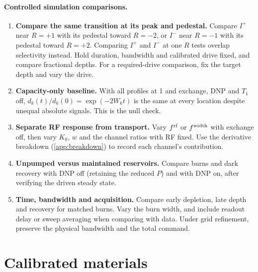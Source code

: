 \documentclass[11pt]{article}
\newcommand{\Iplus}{I^{+}}
\newcommand{\Iminus}{I^{-}}
\begin{document}
\paragraph{Controlled simulation comparisons.}
\begin{enumerate}
  \item \textbf{Compare the same transition at its peak and pedestal.} Compare \(\Iplus\) near
  \(R=+1\) with its pedestal toward \(R=-2\), or \(\Iminus\) near \(R=-1\) with its pedestal toward
  \(R=+2\). Comparing \(\Iplus\) and \(\Iminus\) at one \(R\) tests overlap selectivity instead.
  Hold duration, bandwidth and calibrated drive fixed, and compare fractional depths. For a
  required-drive comparison, fix the target depth and vary the drive.
  \item \textbf{Capacity-only baseline.} With all profiles at 1 and exchange, DNP and \(T_1\) off,
  \(d_k(t)/d_k(0)=\exp(-2W_kt)\) is the same at every location despite unequal absolute signals.
  This is the null check.
  \item \textbf{Separate RF response from transport.} Vary \(f^{\rm rf}\) or \(f^{\rm width}\)
  with exchange off, then vary \(K_0\), \(w\) and the channel ratios with RF fixed. Use the
  derivative breakdown (\cref{app:breakdown}) to record each channel's contribution.
  \item \textbf{Unpumped versus maintained reservoirs.} Compare burns and dark recovery with DNP
  off (retaining the reduced \(P\)) and with DNP on, after verifying the driven steady state.
  \item \textbf{Time, bandwidth and acquisition.} Compare early depletion, late depth and recovery
  for matched burns. Vary the burn width, and include readout delay or sweep averaging when
  comparing with data. Under grid refinement, preserve the physical bandwidth and the total
  command.
\end{enumerate}

\section{Calibrated materials}
\label{sec:materials}
\end{document}
